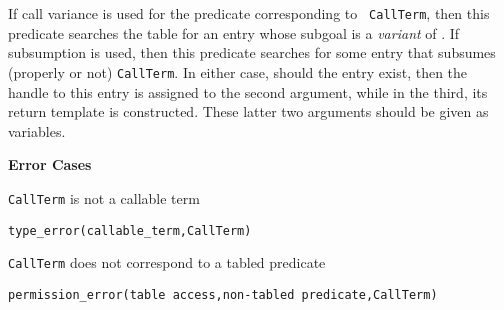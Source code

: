 \begin{description}



%
If call variance is used for the predicate corresponding to {\tt
  CallTerm}, then this predicate searches the table for an entry whose
subgoal is a \emph{variant} of .  If subsumption is
used, then this predicate searches for some entry that subsumes
(properly or not) {\tt CallTerm}.  In either case, should the entry
exist, then the handle to this entry is assigned to the second
argument, while in the third, its return template is constructed.
These latter two arguments should be given as variables.

{\bf Error Cases}
\bi
\item {\tt CallTerm} is not a callable term
\bi
\item {\tt type\_error(callable\_term,CallTerm)}
\ei
\item {\tt CallTerm} does not correspond to a tabled predicate
\bi
\item 	{\tt permission\_error(table access,non-tabled predicate,{\tt CallTerm})}

\ei
\ei
\ \\
\begin{minipage}{6in}
\end{minipage}
\end{description}
